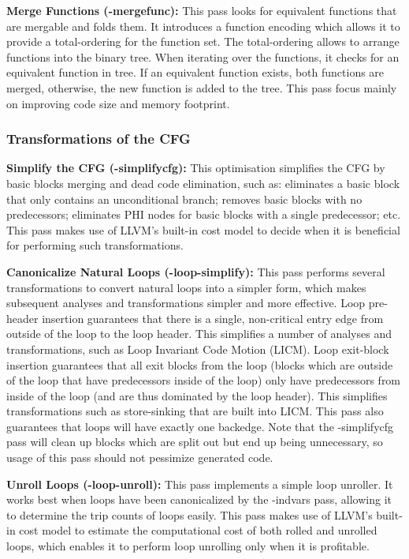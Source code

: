 \noindent\textbf{Merge Functions ({\flagstype -mergefunc}):}
This pass looks for equivalent functions that are mergable and folds them.
It introduces a function encoding which allows it to provide a total-ordering for the function set.
The total-ordering allows to arrange functions into the binary tree.
When iterating over the functions, it checks for an equivalent function in tree.
If an equivalent function exists, both functions are merged, otherwise, the new function is added to the tree.
This pass focus mainly on improving code size and memory footprint.

\subsubsection{Transformations of the CFG}

\noindent\textbf{Simplify the CFG ({\flagstype -simplifycfg}):}
This optimisation simplifies the CFG by basic blocks merging and dead code elimination, such as:
eliminates a basic block that only contains an unconditional branch;
removes basic blocks with no predecessors;
eliminates PHI nodes for basic blocks with a single predecessor; etc.
This pass makes use of LLVM's built-in cost model to decide when it is beneficial for performing such transformations.

\noindent\textbf{Canonicalize Natural Loops ({\flagstype -loop-simplify}):}
This pass performs several transformations to convert natural loops into a simpler form, which makes subsequent analyses and transformations simpler and more effective.
Loop pre-header insertion guarantees that there is a single, non-critical entry edge from outside of the loop to the loop header.
This simplifies a number of analyses and transformations, such as Loop Invariant Code Motion (LICM).
Loop exit-block insertion guarantees that all exit blocks from the loop (blocks which are outside of the loop that have predecessors inside of the loop) only have predecessors from inside of the loop (and are thus dominated by the loop header). This simplifies transformations such as store-sinking that are built into LICM.
This pass also guarantees that loops will have exactly one backedge.
Note that the {\flagstype -simplifycfg} pass will clean up blocks which are split out but end up being unnecessary, so usage of this pass should not pessimize generated code.

\noindent\textbf{Unroll Loops ({\flagstype -loop-unroll}):}
This pass implements a simple loop unroller.
It works best when loops have been canonicalized by the {\flagstype -indvars} pass, allowing it to determine the trip counts of loops easily.
This pass makes use of LLVM's built-in cost model to estimate the computational cost of both rolled and unrolled loops, which enables it to perform loop unrolling only when it is profitable.

